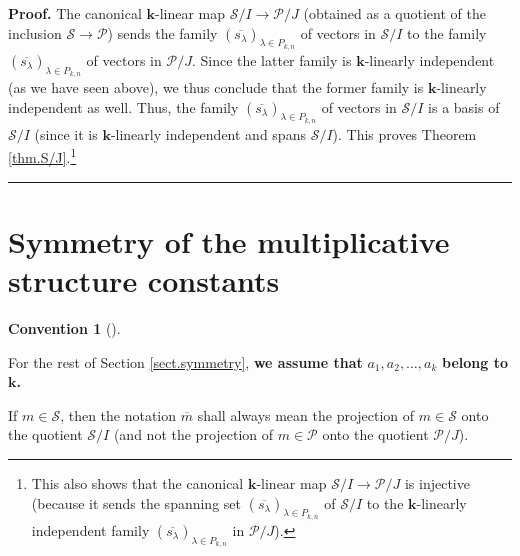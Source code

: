\documentclass[numbers=enddot,12pt,final,onecolumn,notitlepage]{scrartcl}%
\theoremstyle{definition}
\newtheorem{conv}[theo]{Convention}
\newenvironment{convention}[1][]
{\begin{conv}[#1]\begin{leftbar}}
{\end{leftbar}\end{conv}}
\newenvironment{proof}[1][Proof]{\noindent\textbf{#1.} }{\ \rule{0.5em}{0.5em}}
\newenvironment{convention}[1][Convention]{\noindent\textbf{#1.} }{\ \rule{0.5em}{0.5em}}
\newenvironment{convention}[1][Convention]{\noindent\textbf{#1.} }{\ \rule{0.5em}{0.5em}}
\begin{document}
\begin{proof}
The canonical $\mathbf{k}$-linear map $\mathcal{S}/I\rightarrow\mathcal{P}/J$
(obtained as a quotient of the inclusion $\mathcal{S}\rightarrow\mathcal{P}$)
sends the family $\left(  \overline{s_{\lambda}}\right)  _{\lambda\in P_{k,n}%
}$ of vectors in $\mathcal{S}/I$ to the family $\left(  \overline{s_{\lambda}%
}\right)  _{\lambda\in P_{k,n}}$ of vectors in $\mathcal{P}/J$. Since the
latter family is $\mathbf{k}$-linearly independent (as we have seen above), we
thus conclude that the former family is $\mathbf{k}$-linearly independent as
well. Thus, the family $\left(  \overline{s_{\lambda}}\right)  _{\lambda\in
P_{k,n}}$ of vectors in $\mathcal{S}/I$ is a basis of $\mathcal{S}/I$ (since
it is $\mathbf{k}$-linearly independent and spans $\mathcal{S}/I$). This
proves Theorem \ref{thm.S/J}.\footnote{This also shows that the canonical
$\mathbf{k}$-linear map $\mathcal{S}/I\rightarrow\mathcal{P}/J$ is injective
(because it sends the spanning set $\left(  \overline{s_{\lambda}}\right)
_{\lambda\in P_{k,n}}$ of $\mathcal{S}/I$ to the $\mathbf{k}$-linearly
independent family $\left(  \overline{s_{\lambda}}\right)  _{\lambda\in
P_{k,n}}$ in $\mathcal{P}/J$).}
\end{proof}

\section{\label{sect.symmetry}Symmetry of the multiplicative structure
constants}

\begin{convention}
\label{conv.symmetry-conv}For the rest of Section \ref{sect.symmetry},
\textbf{we assume that }$a_{1},a_{2},\ldots,a_{k}$ \textbf{belong to
}$\mathbf{k}$\textbf{.}

If $m\in\mathcal{S}$, then the notation $\overline{m}$ shall always mean the
projection of $m\in\mathcal{S}$ onto the quotient $\mathcal{S}/I$ (and not the
projection of $m\in\mathcal{P}$ onto the quotient $\mathcal{P}/J$).
\end{convention}
\end{document}
